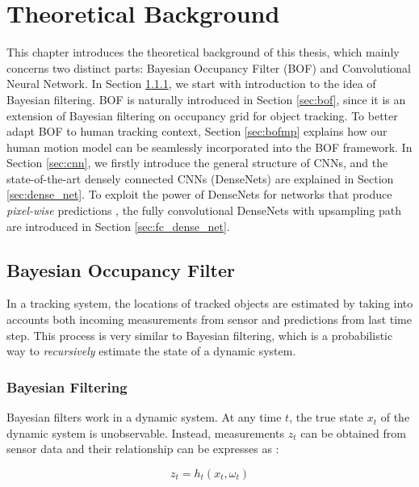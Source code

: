 \chapter{Theoretical Background} \label{chapter:3}

This chapter introduces the theoretical background of this thesis, which mainly concerns two distinct parts: Bayesian Occupancy Filter (BOF) and Convolutional Neural Network. In Section \ref{sec:bayes_filtering}, we start with introduction to the idea of Bayesian filtering. BOF is naturally introduced in Section \ref{sec:bof}, since it is an extension of Bayesian filtering on occupancy grid for object tracking. To better adapt BOF to human tracking context, Section \ref{sec:bofmp} explains how our human motion model can be seamlessly incorporated into the BOF framework. In Section \ref{sec:cnn}, we firstly introduce the general structure of CNNs, and the state-of-the-art densely connected CNNs (DenseNets) are explained in Section \ref{sec:dense_net}. To exploit the power of DenseNets for networks that produce \textit{pixel-wise} predictions , the fully convolutional DenseNets with upsampling path are introduced in Section \ref{sec:fc_dense_net}. 

\section{Bayesian Occupancy Filter} 

In a tracking system, the locations of tracked objects are estimated by taking into accounts both incoming measurements from sensor and predictions from last time step. This process is very similar to Bayesian filtering, which is a probabilistic way to \textit{recursively} estimate the state of a dynamic system.

\subsection{Bayesian Filtering} \label{sec:bayes_filtering}

Bayesian filters work in a dynamic system. At any time $t$, the true state $x_t$ of the dynamic system is unobservable. Instead, measurements $z_t$ can be obtained from sensor data and their relationship can be expresses as \citep{jazwinski2007stochastic}:

\begin{equation}
z_t = h_t(x_t, \omega_t)
\end{equation}

